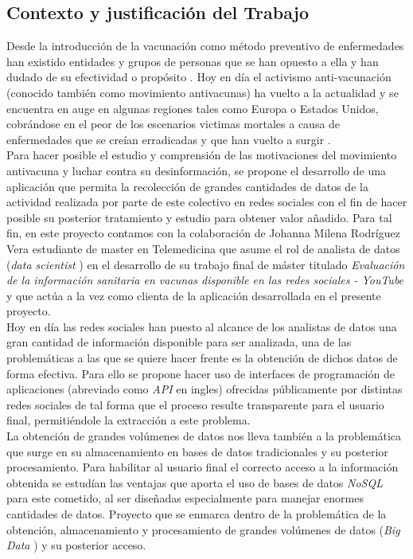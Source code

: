 \documentclass[11pt,a4paper]{article}
\begin{document}
\subsection{Contexto y justificación del Trabajo}
Desde la introducción de la vacunación como método preventivo de enfermedades han existido entidades y grupos de personas que se han opuesto a ella y han dudado de su efectividad o propósito \cite{1}. Hoy en día el activismo anti-vacunación (conocido también como movimiento antivacunas) ha vuelto a la actualidad y se encuentra en auge en algunas regiones tales como Europa o Estados Unidos, cobrándose en el peor de los escenarios victimas mortales a causa de enfermedades que se creían erradicadas y que han vuelto a surgir \cite{2}\cite{3}.
\\

Para hacer posible el estudio y comprensión de las motivaciones del movimiento antivacuna y luchar contra su desinformación, se propone el desarrollo de una aplicación que permita la recolección de grandes cantidades de datos de la actividad realizada por parte de este colectivo en redes sociales con el fin de hacer posible su posterior tratamiento y estudio para obtener valor añadido. Para tal fin, en este proyecto contamos con la colaboración de Johanna Milena Rodríguez Vera estudiante de master en Telemedicina que asume el rol de analista de datos (\textit{data scientist} \cite{4}) en el desarrollo de su trabajo final de máster titulado \textit{Evaluación de la información sanitaria en vacunas disponible en las redes sociales - YouTube} y que actúa a la vez como clienta de la aplicación desarrollada en el presente proyecto.
\\

Hoy en día las redes sociales han puesto al alcance de los analistas de datos una gran cantidad de información disponible para ser analizada, una de las problemáticas a las que se quiere hacer frente es la obtención de dichos datos de forma efectiva. Para ello se propone hacer uso de interfaces de programación de aplicaciones (abreviado como \textit{API} \cite{5} en ingles) ofrecidas públicamente por distintas redes sociales de tal forma que el proceso resulte transparente para el usuario final, permitiéndole la extracción a este problema.
\\

La obtención de grandes volúmenes de datos nos lleva también a la problemática que surge en su almacenamiento en bases de datos tradicionales y su posterior procesamiento. Para habilitar al usuario final el correcto acceso a la información obtenida se estudían las ventajas que aporta el uso de bases de datos \textit{NoSQL} \cite{6} para este cometido, al ser diseñadas especialmente para manejar enormes cantidades de datos. Proyecto que se enmarca dentro de la problemática de la obtención, almacenamiento y procesamiento de grandes volúmenes de datos (\textit{Big Data} \cite{7}) y su posterior acceso.
\newpage
\end{document}
